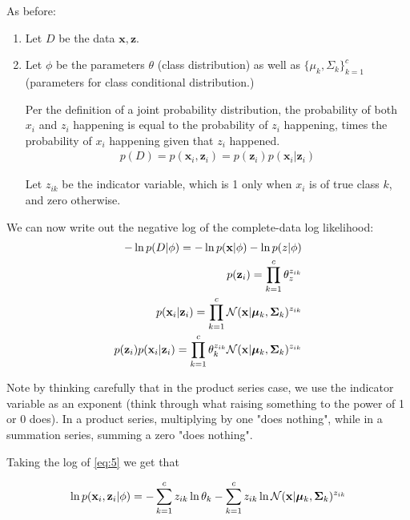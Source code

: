 \documentclass[submit]{harvardml}
\newenvironment{answer}{%
\color{answergreen}\sffamily\large}{}
\newcommand{\bx}{\mathbf{x}} %
\newcommand{\bz}{\mathbf{z}} %
\begin{document}
\begin{enumerate}
		\begin{answer}

    As before:
    \begin{enumerate}
        \item Let $D$ be the data $\bx, \bz$.
        \item Let $\phi$ be the parameters $\theta$ (class distribution) as well as $\{\mu_k,
            \Sigma_k\}_{k=1}^c$ (parameters for class conditional distribution.)

            Per the definition of a joint probability distribution, the probability of both $x_i$ and
            $z_i$ happening is equal to the probability of $z_i$ happening, times the probability of
            $x_i$ happening given that $z_i$ happened.
            \begin{align}
                p( D ) = p(\bx_i, \bz_i) = p(\bz_i) p(\bx_i | \bz_i)
            \end{align}

            Let $z_{ik}$ be the indicator variable, which is 1 only when $x_i$ is of true class $k$, and
            zero otherwise.

    \end{enumerate}

            We can now write out the negative log of the complete-data log likelihood:
            \begin{align}
                -\ln p( D | \phi) =  -\ln p(\bx | \phi) - \ln p( z | \phi) \\
                p(\bz_i) = \prod_{k=1}^c \theta_z^{z_{ik}} \\ 
                p(\bx_i | \bz_i ) = \prod_{k=1}^c \mathcal{N}(\bx|\bmu_k,\bSigma_k)^{z_{ik}} \\
                p(\bz_i) p(\bx_i | \bz_i) = \prod_{k=1}^c \theta_k^{z_{ik}}\mathcal{N}(\bx|\bmu_k,\bSigma_k)^{z_{ik}} 
                \label{eq:5}
            \end{align}

            Note by thinking carefully that in the product series case, we use the indicator variable as
            an exponent (think through what raising something to the power of 1 or 0 does). In a product
            series, multiplying by one "does nothing", while in a summation series, summing a zero "does
            nothing".

            Taking the log of \cref{eq:5} we get that 

            \begin{align}
                \ln p(\bx_i, \bz_i | \phi) = 
                    - \sum_{k=1}^c z_{ik} \ln \theta_k
                    - \sum_{k=1}^c  z_{ik} \ln \mathcal{N}(\bx|\bmu_k,\bSigma_k)^{z_{ik}}
            \end{align}




\end{answer}
\end{enumerate}
\end{document}

